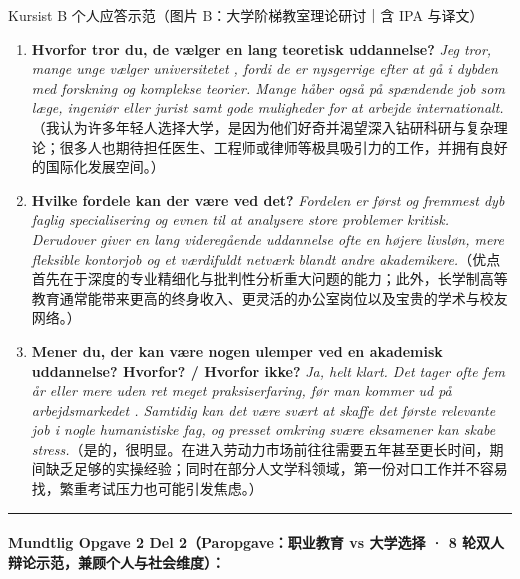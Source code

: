 \begin{grammatikbox}{Kursist B 个人应答示范（图片 B：大学阶梯教室理论研讨｜含 IPA 与译文）}
\small
\begin{enumerate}
  \item \textbf{Hvorfor tror du, de vælger en lang teoretisk uddannelse?} \textit{Jeg tror, mange unge vælger universitetet , fordi de er nysgerrige efter at gå i dybden med forskning og komplekse teorier. Mange håber også på spændende job som læge, ingeniør eller jurist samt gode muligheder for at arbejde internationalt.}（我认为许多年轻人选择大学，是因为他们好奇并渴望深入钻研科研与复杂理论；很多人也期待担任医生、工程师或律师等极具吸引力的工作，并拥有良好的国际化发展空间。）
  \item \textbf{Hvilke fordele kan der være ved det?} \textit{Fordelen er først og fremmest dyb faglig specialisering \mbox{} og evnen til at analysere store problemer kritisk. Derudover giver en lang videregående uddannelse ofte en højere livsløn, mere fleksible kontorjob og et værdifuldt netværk blandt andre akademikere.}（优点首先在于深度的专业精细化与批判性分析重大问题的能力；此外，长学制高等教育通常能带来更高的终身收入、更灵活的办公室岗位以及宝贵的学术与校友网络。）
  \item \textbf{Mener du, der kan være nogen ulemper ved en akademisk uddannelse? Hvorfor? / Hvorfor ikke?} \textit{Ja, helt klart. Det tager ofte fem år eller mere uden ret meget praksiserfaring, før man kommer ud på arbejdsmarkedet . Samtidig kan det være svært at skaffe det første relevante job i nogle humanistiske fag, og presset omkring svære eksamener kan skabe stress.}（是的，很明显。在进入劳动力市场前往往需要五年甚至更长时间，期间缺乏足够的实操经验；同时在部分人文学科领域，第一份对口工作并不容易找，繁重考试压力也可能引发焦虑。）
\end{enumerate}
\end{grammatikbox}

\vspace{0.35em}
\hrule
\vspace{0.35em}
\paragraph*{Mundtlig Opgave 2 Del 2（Paropgave：职业教育 vs 大学选择 · 8 轮双人辩论示范，兼顾个人与社会维度）：}

